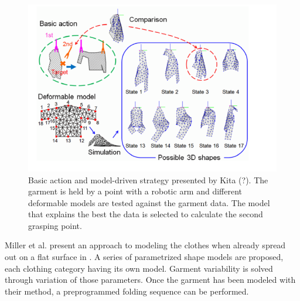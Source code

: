 \begin{figure}[thpb]
    \centering
    \includegraphics[width=0.95
    \textwidth]{figures/SOTA_Kita_2009.png}
    \caption{Basic action and model-driven strategy presented by Kita  (?). The garment is held by a point with a robotic arm and different deformable models are tested against the garment data. The model that explains the best the data is selected to calculate the second grasping point. }
    \label{fig:SOTA_Kita_2009}
\end{figure}

Miller et al. present an approach to modeling the clothes when already spread out on a flat surface in \cite{Miller2011}. A series of parametrized shape models are proposed, each clothing category having its own model. Garment variability is solved through variation of those parameters. Once the garment has been modeled with their method, a preprogrammed folding sequence can be performed.


